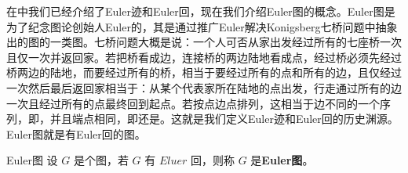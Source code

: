 
\cite{graph2}在中我们已经介绍了Euler迹和Euler回，现在我们介绍Euler图的概念。Euler图是为了纪念图论创始人Euler的，其是通过推广Euler解决Konigsberg七桥问题中抽象出的图的一类图。七桥问题大概是说：一个人可否从家出发经过所有的七座桥一次且仅一次并返回家。若把桥看成边，连接桥的两边陆地看成点，经过桥必须先经过桥两边的陆地，而要经过所有的桥，相当于要经过所有的点和所有的边，且仅经过一次然后最后返回家相当于：从某个代表家所在陆地的点出发，行走通过所有的边一次且经过所有的点最终回到起点。若按点边点排列，这相当于边不同的一个序列，即，并且端点相同，即还是。这就是我们定义Euler迹和Euler回的历史渊源。Euler图就是有Euler回的图。

\begin{definition}{Euler图}
设 $G$ 是个图，若 $G$ 有 $Eluer$ 回，则称 $G$ 是\textbf{Euler图}。
\end{definition}










